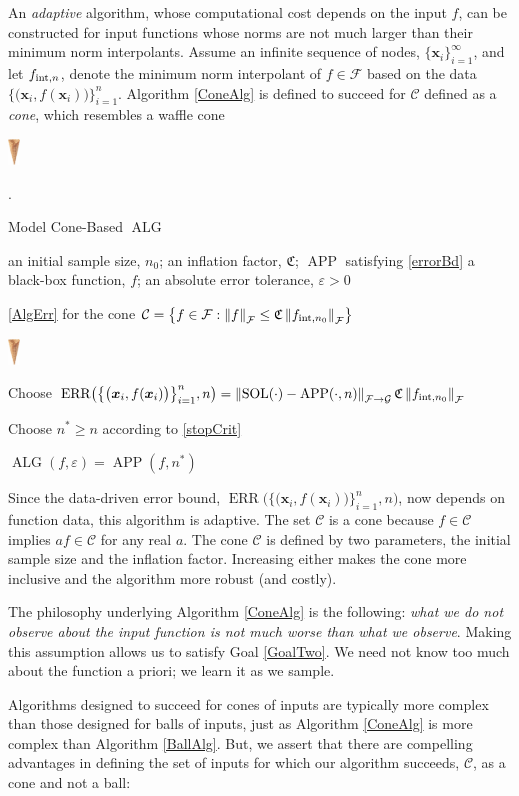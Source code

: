 \documentclass[11pt]{NSFamsart}
\DeclareMathOperator{\SOL}{SOL}
\DeclareMathOperator{\APP}{APP}
\DeclareMathOperator{\ALG}{ALG}
\DeclareMathOperator{\ERR}{ERR}
\newcommand{\bx}{{\boldsymbol{x}}}
\newcommand{\cc}{\mathcal{C}}
\newcommand{\calc}{{\mathcal{C}}}
\newcommand{\calf}{{\mathcal{F}}}
\newcommand{\calg}{{\mathcal{G}}}
\newcommand{\fC}{\mathfrak{C}}
\newcommand{\norm}[2][{}]{\ensuremath{\left \lVert #2 \right \rVert}_{#1}}
\newcommand{\designInf}{\{\bx_i\}_{i=1}^\infty}
\newcommand{\dataN}{\bigl\{\bigl(\bx_i,f(\bx_i)\bigr)\bigr\}_{i=1}^n}
\newcommand{\ErrN}{\ERR\bigl(\dataN,n\bigr)}
\newcommand{\inflate}{\fC}
\newcommand{\smallcone}{\parbox{0.7cm}{\includegraphics[width=0.32cm,angle=270]{ProgramsImages/MediumWaffleCone.eps}}\xspace}
\begin{document}
An \emph{adaptive} algorithm, whose computational cost depends on the input $f$, can be constructed for input functions whose norms are not much larger than their minimum norm interpolants.  Assume an infinite sequence of nodes, $\designInf$, and let $f_{\textup{int},n}$, denote the minimum norm interpolant of $f \in \calf$ based on the data $\dataN$.  Algorithm \ref{ConeAlg} is defined to succeed for $\calc$ defined as a \emph{cone}, which resembles a waffle cone \smallcone.

\begin{algorithm}
	\caption{Model Cone-Based $\ALG$ \label{ConeAlg}} 
	\begin{algorithmic}
	\PARAM an initial sample size, $n_0$; an inflation factor, $\fC$; $\APP$ satisfying \eqref{errorBd}
		\INPUT a black-box function, $f$; an absolute error tolerance,
		$\varepsilon>0$

\Ensure \eqref{AlgErr} for  the cone $\cc = \bigl\{f \in \calf : \norm[\calf]{f} \le \inflate \norm[\calf]{f_{\textup{int},n_0}} \bigr \}$\smallcone

\State Choose $\ErrN = \norm[\calf \to \calg]{\SOL(\cdot) - \APP(\cdot,n)} \inflate \norm[\calf]{f_{\textup{int},n_0}}$ \\ 

\State Choose $n^* \ge n$ according to \eqref{stopCrit}

\RETURN $\ALG(f,\varepsilon) = \APP(f,n^*)$
\end{algorithmic}
\end{algorithm}

Since the data-driven error bound, $\ErrN$, now depends on function data, this algorithm is adaptive.  The set $\calc$ is a cone because $f \in \calc$ implies $a f \in \calc$ for any real $a$.  The cone $\calc$ is defined by two parameters, the initial sample size and the inflation factor.  Increasing either makes the cone more inclusive and the algorithm more robust (and costly).  

The philosophy underlying Algorithm \ref{ConeAlg} is the following: \emph{what we do not observe about the input function is not much worse than what we observe}.  Making this assumption allows us to satisfy Goal \ref{GoalTwo}.  We need not know too much about the function a priori; we learn it as we sample.

Algorithms designed to succeed for cones of inputs are typically more complex than those designed for balls of inputs, just as Algorithm \ref{ConeAlg} is more complex than Algorithm \ref{BallAlg}.  But, we assert that there are compelling advantages in defining the set of inputs for which our algorithm succeeds, $\calc$, as a cone and not a ball:
\end{document}
